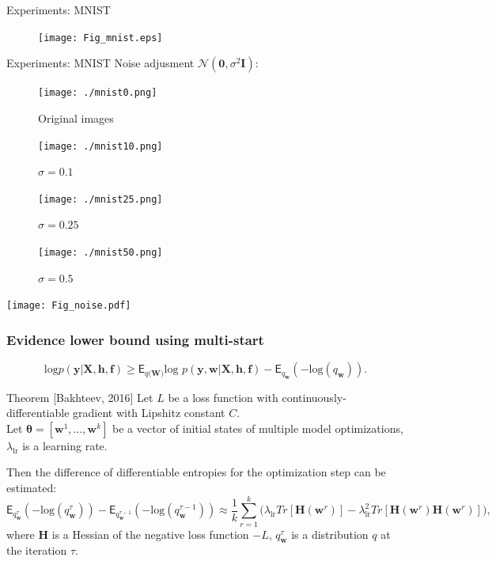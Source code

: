 \documentclass[usenames,dvipsnames,11pt,pdf,utf8,russian,aspectratio=43]{beamer}
\begin{document}
\begin{frame}{Experiments: MNIST}
\begin{figure}  
\texttt{[image: Fig\_mnist.eps]}
\end{figure}
\end{frame}


\begin{frame}{Experiments: MNIST}
Noise adjusment $\mathcal{N}(\mathbf{0},\sigma^2\mathbf{I})$:
\setlength{\columnsep}{10pt}
\begin{multicols}{4}
\begin{figure}[h]
\texttt{[image: ./mnist0.png]}
\caption*{Original images}
\end{figure}

\begin{figure}[h]
\texttt{[image: ./mnist10.png]}
\caption*{$\sigma=0.1$}
\end{figure}

\begin{figure}[h]
\texttt{[image: ./mnist25.png]}
\caption*{$\sigma=0.25$}
\end{figure}

\begin{figure}[h]
\texttt{[image: ./mnist50.png]}
\caption*{$\sigma=0.5$}
\end{figure}
\end{multicols}
\begin{center}
\texttt{[image: Fig\_noise.pdf]}
\end{center}
\end{frame}


\begin{frame}
\small
\frametitle{Evidence lower bound using multi-start}
$$\text{log}p(\mathbf{y}|\mathbf{X}, \mathbf{h},\mathbf{f}) \geq \mathsf{E}_{q(\mathbf{W)}}\text{log~}p (\mathbf{y}, \mathbf{w}|\mathbf{X}, \mathbf{h},\mathbf{f}) - \mathsf{E}_{q_{\mathbf{w}}}(-\text{log}(q_\mathbf{w})).$$

\begin{block}{Theorem [Bakhteev, 2016]} Let  $L$ be a loss function with continuously-differentiable gradient with Lipshitz constant $C$. \\
Let $\boldsymbol{\theta} = [\mathbf{w}^1,\dots,\mathbf{w}^k]$ be a vector of initial states of multiple model optimizations, $\lambda_\text{lr}$ is a learning rate.

Then the difference of differentiable entropies for the optimization step can be estimated:
\small
\[
	\mathsf{E}_{q^{\tau}_{\mathbf{w}}}(-\text{log}(q^{\tau}_\mathbf{w})) -  \mathsf{E}_{q^{\tau-1}_{\mathbf{w}}}(-\text{log}(q^{\tau-1}_\mathbf{w}))  \approx  \frac{1}{k}\sum_{r=1}^k \bigl(\lambda_\text{lr} Tr[\mathbf{H}(\mathbf{w}^r)] - \lambda_\text{lr}^2 Tr[\mathbf{H}(\mathbf{w}^r)\mathbf{H}(\mathbf{w}^r)]  \bigr),
\]
where $\mathbf{H}$ is a Hessian of the negative loss function $-L$, $q^{\tau}_\mathbf{w}$ is a distribution $q$ at the iteration $\tau$.
\end{block}
\end{frame}
\end{document}
